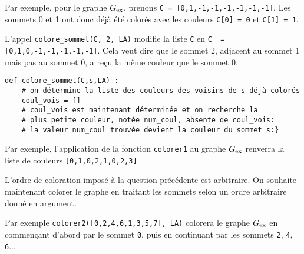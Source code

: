 Par exemple, pour le graphe ${G}_{\text{ex}}$, prenons \lstinline{C = [0,1,-1,-1,-1,-1,-1,-1]}. Les sommets 0 et 1 ont donc déjà été colorés avec les couleurs \lstinline{C[0] = 0} et \lstinline{C[1] = 1}.

L'appel \lstinline{colore_sommet(C, 2, LA)} modifie la liste \lstinline{C} en \lstinline{C  = [0,1,0,-1,-1,-1,-1,-1]}. Cela veut dire que le sommet 2, adjacent au sommet 1 mais pas au sommet 0, a reçu la même couleur que le sommet 0.


\ifprof
\begin{corrige}

\end{corrige}
\else

\fi
\begin{lstlisting}
def colore_sommet(C,s,LA) :
    # on détermine la liste des couleurs des voisins de s déjà colorés
    coul_vois = []
    # coul_vois est maintenant déterminée et on recherche la
    # plus petite couleur, notée num_coul, absente de coul_vois:
    # la valeur num_coul trouvée devient la couleur du sommet s:}
\end{lstlisting}

Par exemple, l'application de la fonction \lstinline{colorer1} au graphe ${G}_{\text{ex}}$ renverra la liste de couleurs \lstinline{[0,1,0,2,1,0,2,3]}.
\ifprof
\begin{corrige}

\end{corrige}
\else
\fi


L'ordre de coloration imposé à la question précédente est arbitraire. On souhaite maintenant colorer le graphe en traitant les sommets selon un ordre arbitraire donné en argument.


Par exemple \lstinline{colorer2([0,2,4,6,1,3,5,7], LA)} colorera le graphe ${G}_{\text{ex}}$ en commençant d'abord par le sommet \lstinline{0}, puis en continuant par les sommets \lstinline{2}, \lstinline{4}, \lstinline{6}...
\ifprof
\begin{corrige}

\end{corrige}
\else
\fi

